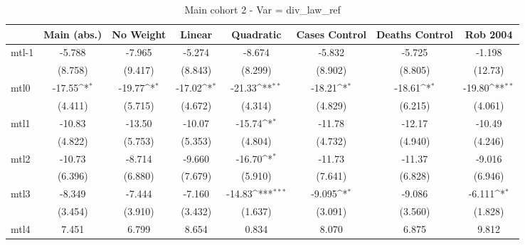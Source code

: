 \documentclass{article}
\begin{document}
{
\def\sym#1{\ifmmode^{#1}\else\(^{#1}\)\fi}
\begin{longtable}{l*{7}{c}}
\caption{Main cohort 2 - Var = div\_law\_ref}\\
\hline\hline\endfirsthead\hline\endhead\hline\endfoot\endlastfoot
                &\multicolumn{1}{c}{Main (abs.)}&\multicolumn{1}{c}{No Weight}&\multicolumn{1}{c}{Linear}&\multicolumn{1}{c}{Quadratic}&\multicolumn{1}{c}{Cases Control}&\multicolumn{1}{c}{Deaths Control}&\multicolumn{1}{c}{Rob 2004}\\
\hline
mtl-1           &   -5.788         &   -7.965         &   -5.274         &   -8.674         &   -5.832         &   -5.725         &   -1.198         \\
                &  (8.758)         &  (9.417)         &  (8.843)         &  (8.299)         &  (8.902)         &  (8.805)         &  (12.73)         \\
mtl0            &   -17.55\sym{*}  &   -19.77\sym{*}  &   -17.02\sym{*}  &   -21.33\sym{**} &   -18.21\sym{*}  &   -18.61\sym{*}  &   -19.80\sym{**} \\
                &  (4.411)         &  (5.715)         &  (4.672)         &  (4.314)         &  (4.829)         &  (6.215)         &  (4.061)         \\
mtl1            &   -10.83         &   -13.50         &   -10.07         &   -15.74\sym{*}  &   -11.78         &   -12.17         &   -10.49         \\
                &  (4.822)         &  (5.753)         &  (5.353)         &  (4.804)         &  (4.732)         &  (4.940)         &  (4.246)         \\
mtl2            &   -10.73         &   -8.714         &   -9.660         &   -16.70\sym{*}  &   -11.73         &   -11.37         &   -9.016         \\
                &  (6.396)         &  (6.880)         &  (7.679)         &  (5.910)         &  (7.641)         &  (6.828)         &  (6.946)         \\
mtl3            &   -8.349         &   -7.444         &   -7.160         &   -14.83\sym{***}&   -9.095\sym{*}  &   -9.086         &   -6.111\sym{*}  \\
                &  (3.454)         &  (3.910)         &  (3.432)         &  (1.637)         &  (3.091)         &  (3.560)         &  (1.828)         \\
mtl4            &    7.451         &    6.799         &    8.654         &    0.834         &    8.070         &    6.875         &    9.812         \\

\end{longtable}}
\end{document}
